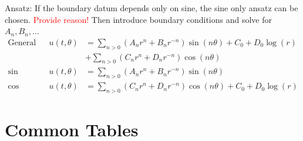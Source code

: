 \documentclass[10pt,landscape]{scrartcl}
\begin{document}
\begin{multicols*}{2}
  Ansatz: If the boundary datum depends only on sine, the sine only ansatz can be chosen. \textcolor{red}{Provide reason!} Then introduce boundary conditions and solve for $A_n,B_n, \dots$
  \begin{align*}
    \text{General} && u(t,\theta) &= \sum_{n>0}\left(A_nr^n+B_nr^{-n}\right)\sin(n\theta) + C_0 + D_0\log(r) \\
                               && &+ \sum_{n>0}\left(C_nr^n+D_nr^{-n}\right)\cos(n\theta) \\
    \text{sin only} && u(t,\theta) &= \sum_{n>0}\left(A_nr^n+B_nr^{-n}\right)\sin(n\theta) \\
    \text{cos only} && u(t,\theta) &= \sum_{n>0}\left(C_nr^n+D_nr^{-n}\right)\cos(n\theta) + C_0 + D_0\log(r)
  \end{align*}


% 
\vfill\null
\columnbreak
\section{Common Tables}

\end{multicols*}
\end{document}
